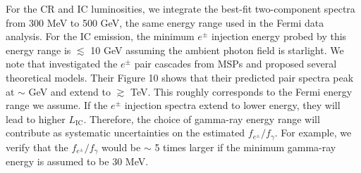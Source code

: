 \documentclass[doublespace,nopageskip]{VTthesis}
\begin{document}
For the CR and IC luminosities, we integrate the best-fit two-component spectra from 300 MeV to 500 GeV, the same energy range used in the Fermi data analysis. For the IC emission, the minimum $e^\pm$ injection energy probed by this energy range is $\lesssim$ 10 GeV assuming the ambient photon field is starlight. We note that \citet{2011ApJ...743..181H} investigated the $e^\pm$ pair cascades from MSPs and proposed several theoretical models. Their Figure 10 shows that their predicted pair spectra peak at $\sim$ GeV and extend to $\gtrsim$ TeV. This roughly corresponds to the Fermi energy range we assume. If the $e^\pm$ injection spectra extend to lower energy, they will lead to higher $L_\mathrm{IC}$. Therefore, the choice of gamma-ray energy range will contribute as systematic uncertainties on the estimated $f_{e^\pm}/f_\gamma$. For example, we verify that the $f_{e^\pm}/f_\gamma$ would be $\sim$ 5 times larger if the minimum gamma-ray energy is assumed to be 30 MeV.
\end{document}
